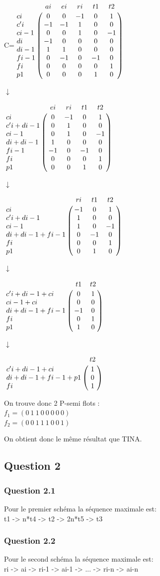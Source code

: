 \begin{center}


{\Huge C}\qquad =\qquad $\bordermatrix{
&ai&ei&ri&t1&t2\cr
ci&0&0&-1&0&1\cr
c'i&-1&-1&1&0&0\cr
ci-1&0&0&1&0&-1\cr
di&-1&0&0&0&0\cr
di-1&1&1&0&0&0\cr
fi-1&0&-1&0&-1&0\cr
fi&0&0&0&0&1\cr
p1&0&0&0&1&0\cr
}$

{\Huge $\downarrow$}

$\bordermatrix{
&ei&ri&t1&t2\cr
ci&0&-1&0&1\cr
c'i+di-1&0&1&0&0\cr
ci-1&0&1&0&-1\cr
di+di-1&1&0&0&0\cr
fi-1&-1&0&-1&0\cr
fi&0&0&0&1\cr
p1&0&0&1&0\cr
}$

{\Huge $\downarrow$}

$\bordermatrix{
&ri&t1&t2\cr
ci&-1&0&1\cr
c'i+di-1&1&0&0\cr
ci-1&1&0&-1\cr
di+di-1+fi-1&0&-1&0\cr
fi&0&0&1\cr
p1&0&1&0\cr
}$

{\Huge $\downarrow$}

$\bordermatrix{
&t1&t2\cr
c'i+di-1+ci&0&1\cr
ci-1+ci&0&0\cr
di+di-1+fi-1&-1&0\cr
fi&0&1\cr
p1&1&0\cr
}$

{\Huge $\downarrow$}

$\bordermatrix{
&t2\cr
c'i+di-1+ci&1\cr
di+di-1+fi-1+p1&0\cr
fi&1\cr
}$

\vspace{1cm}

On trouve donc 2 P-semi flots :\\
$f_1 = (0\ 1\ 1\ 0\ 0\ 0\ 0\ 0)$\\
$f_2 = (0\ 0\ 1\ 1\ 1\ 0\ 0\ 1)$\\

\end{center}

On obtient donc le même résultat que TINA.


\subsection{Question 2}
\subsubsection{Question 2.1}
Pour le premier schéma la séquence maximale est:\\
t1 -> n*t4 -> t2 -> 2n*t5 -> t3

\subsubsection{Question 2.2}
Pour le second schéma la séquence maximale est:\\
ri -> ai -> ri-1 -> ai-1 -> ... -> ri-n -> ai-n

